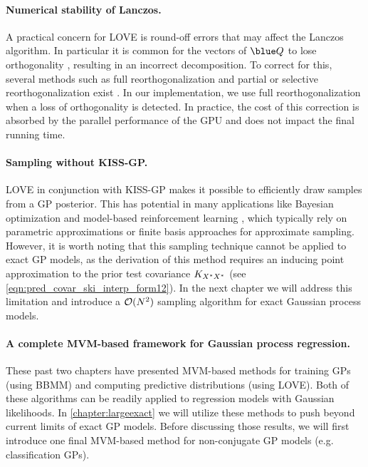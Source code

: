 \paragraph{Numerical stability of Lanczos.}
A practical concern for LOVE{} is round-off errors that may affect the Lanczos algorithm.
In particular it is common for the vectors of $\blue \bQ$ to lose orthogonality \cite{paige1970practical,simon1984lanczos,golub2012matrix}, resulting in an incorrect decomposition.
To correct for this, several methods such as full reorthogonalization and partial or selective reorthogonalization exist \citep[e.g.][]{golub2012matrix}.
In our implementation, we use full reorthogonalization when a loss of orthogonality is detected.
In practice, the cost of this correction is absorbed by the parallel performance of the GPU and does not impact the final running time.


\paragraph{Sampling without KISS-GP.}
LOVE in conjunction with KISS-GP makes it possible to efficiently draw samples from a GP posterior.
This has potential in many applications like Bayesian optimization and model-based reinforcement learning \citep[e.g.,][]{deisenroth2011pilco,hernandez2014predictive,wang2017max}, which typically rely on parametric approximations or finite basis approaches for approximate sampling.
However, it is worth noting that this sampling technique cannot be applied to exact GP models,
as the derivation of this method requires an inducing point approximation to the prior test covariance $K_{X^*X^*}$ (see \cref{eqn:pred_covar_ski_interp_form12}).
In the next chapter we will address this limitation and introduce a $\bigo{N^2}$ sampling algorithm for exact Gaussian process models.

\paragraph{A complete MVM-based framework for Gaussian process regression.}
These past two chapters have presented MVM-based methods for training GPs (using BBMM) and computing predictive distributions (using LOVE).
Both of these algorithms can be readily applied to regression models with Gaussian likelihoods.
In \cref{chapter:largeexact} we will utilize these methods to push beyond current limits of exact GP models.
Before discussing those results, we will first introduce one final MVM-based method for non-conjugate GP models (e.g. classification GPs).
